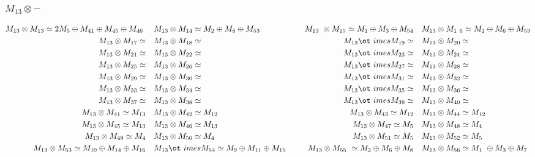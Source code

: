 \subsubsection{$M_13\otimes -$}
\begin{align*}
M_{13} \otimes M_{13} \simeq 2 M_{5} \oplus M_{41} \oplus M_{45} \oplus M_{46}\
 &&& M_{13} \otimes M_{14} \simeq M_{2} \oplus M_{8} \oplus M_{53} &&& M_{13} \
\otimes M_{15} \simeq M_{1} \oplus M_{3} \oplus M_{54} &&& M_{13} \otimes M_{1\
6} \simeq M_{2} \oplus M_{6} \oplus M_{53}\\
M_{13} \otimes M_{17} \simeq  &&& M_{13} \otimes M_{18} \simeq  &&& M_{13} \ot\
imes M_{19} \simeq  &&& M_{13} \otimes M_{20} \simeq \\
M_{13} \otimes M_{21} \simeq  &&& M_{13} \otimes M_{22} \simeq  &&& M_{13} \ot\
imes M_{23} \simeq  &&& M_{13} \otimes M_{24} \simeq \\
M_{13} \otimes M_{25} \simeq  &&& M_{13} \otimes M_{26} \simeq  &&& M_{13} \ot\
imes M_{27} \simeq  &&& M_{13} \otimes M_{28} \simeq \\
M_{13} \otimes M_{29} \simeq  &&& M_{13} \otimes M_{30} \simeq  &&& M_{13} \ot\
imes M_{31} \simeq  &&& M_{13} \otimes M_{32} \simeq \\
M_{13} \otimes M_{33} \simeq  &&& M_{13} \otimes M_{34} \simeq  &&& M_{13} \ot\
imes M_{35} \simeq  &&& M_{13} \otimes M_{36} \simeq \\
M_{13} \otimes M_{37} \simeq  &&& M_{13} \otimes M_{38} \simeq  &&& M_{13} \ot\
imes M_{39} \simeq  &&& M_{13} \otimes M_{40} \simeq \\
M_{13} \otimes M_{41} \simeq M_{13} &&& M_{13} \otimes M_{42} \simeq M_{12} &&\
& M_{13} \otimes M_{43} \simeq M_{12} &&& M_{13} \otimes M_{44} \simeq M_{12}\
\\
M_{13} \otimes M_{45} \simeq M_{13} &&& M_{13} \otimes M_{46} \simeq M_{13} &&\
& M_{13} \otimes M_{47} \simeq M_{5} &&& M_{13} \otimes M_{48} \simeq M_{4}\\
M_{13} \otimes M_{49} \simeq M_{4} &&& M_{13} \otimes M_{50} \simeq M_{4} &&& \
M_{13} \otimes M_{51} \simeq M_{5} &&& M_{13} \otimes M_{52} \simeq M_{5}\\
M_{13} \otimes M_{53} \simeq M_{10} \oplus M_{14} \oplus M_{16} &&& M_{13} \ot\
imes M_{54} \simeq M_{9} \oplus M_{11} \oplus M_{15} &&& M_{13} \otimes M_{55}\
 \simeq M_{2} \oplus M_{6} \oplus M_{8} &&& M_{13} \otimes M_{56} \simeq M_{1}\
 \oplus M_{3} \oplus M_{7}\\
\end{align*}

